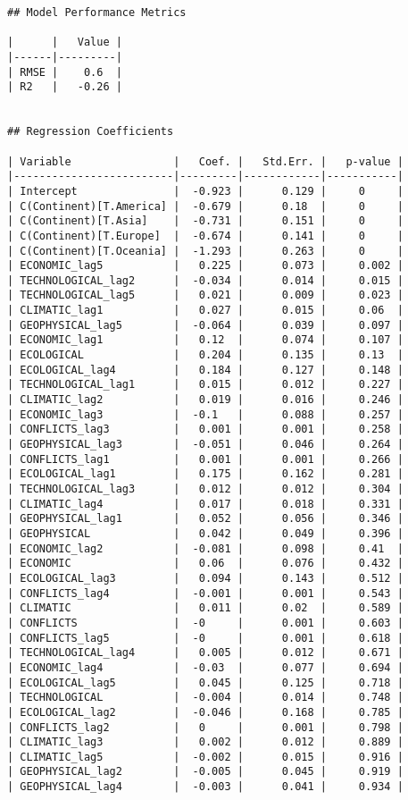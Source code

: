 \documentclass[
]{article}
\begin{document}
\label{results}
\begin{verbatim}
## Model Performance Metrics

|      |   Value |
|------|---------|
| RMSE |    0.6  |
| R2   |   -0.26 |


## Regression Coefficients

| Variable                |   Coef. |   Std.Err. |   p-value |
|-------------------------|---------|------------|-----------|
| Intercept               |  -0.923 |      0.129 |     0     |
| C(Continent)[T.America] |  -0.679 |      0.18  |     0     |
| C(Continent)[T.Asia]    |  -0.731 |      0.151 |     0     |
| C(Continent)[T.Europe]  |  -0.674 |      0.141 |     0     |
| C(Continent)[T.Oceania] |  -1.293 |      0.263 |     0     |
| ECONOMIC_lag5           |   0.225 |      0.073 |     0.002 |
| TECHNOLOGICAL_lag2      |  -0.034 |      0.014 |     0.015 |
| TECHNOLOGICAL_lag5      |   0.021 |      0.009 |     0.023 |
| CLIMATIC_lag1           |   0.027 |      0.015 |     0.06  |
| GEOPHYSICAL_lag5        |  -0.064 |      0.039 |     0.097 |
| ECONOMIC_lag1           |   0.12  |      0.074 |     0.107 |
| ECOLOGICAL              |   0.204 |      0.135 |     0.13  |
| ECOLOGICAL_lag4         |   0.184 |      0.127 |     0.148 |
| TECHNOLOGICAL_lag1      |   0.015 |      0.012 |     0.227 |
| CLIMATIC_lag2           |   0.019 |      0.016 |     0.246 |
| ECONOMIC_lag3           |  -0.1   |      0.088 |     0.257 |
| CONFLICTS_lag3          |   0.001 |      0.001 |     0.258 |
| GEOPHYSICAL_lag3        |  -0.051 |      0.046 |     0.264 |
| CONFLICTS_lag1          |   0.001 |      0.001 |     0.266 |
| ECOLOGICAL_lag1         |   0.175 |      0.162 |     0.281 |
| TECHNOLOGICAL_lag3      |   0.012 |      0.012 |     0.304 |
| CLIMATIC_lag4           |   0.017 |      0.018 |     0.331 |
| GEOPHYSICAL_lag1        |   0.052 |      0.056 |     0.346 |
| GEOPHYSICAL             |   0.042 |      0.049 |     0.396 |
| ECONOMIC_lag2           |  -0.081 |      0.098 |     0.41  |
| ECONOMIC                |   0.06  |      0.076 |     0.432 |
| ECOLOGICAL_lag3         |   0.094 |      0.143 |     0.512 |
| CONFLICTS_lag4          |  -0.001 |      0.001 |     0.543 |
| CLIMATIC                |   0.011 |      0.02  |     0.589 |
| CONFLICTS               |  -0     |      0.001 |     0.603 |
| CONFLICTS_lag5          |  -0     |      0.001 |     0.618 |
| TECHNOLOGICAL_lag4      |   0.005 |      0.012 |     0.671 |
| ECONOMIC_lag4           |  -0.03  |      0.077 |     0.694 |
| ECOLOGICAL_lag5         |   0.045 |      0.125 |     0.718 |
| TECHNOLOGICAL           |  -0.004 |      0.014 |     0.748 |
| ECOLOGICAL_lag2         |  -0.046 |      0.168 |     0.785 |
| CONFLICTS_lag2          |   0     |      0.001 |     0.798 |
| CLIMATIC_lag3           |   0.002 |      0.012 |     0.889 |
| CLIMATIC_lag5           |  -0.002 |      0.015 |     0.916 |
| GEOPHYSICAL_lag2        |  -0.005 |      0.045 |     0.919 |
| GEOPHYSICAL_lag4        |  -0.003 |      0.041 |     0.934 |
\end{verbatim}
\end{document}
